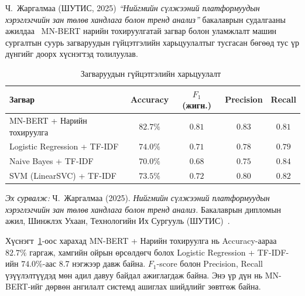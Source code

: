 Ч.~Жаргалмаа (ШУТИС, 2025) \textit{``Нийгмийн сүлжээний платформуудын
хэрэглэгчийн зан төлөв хандлага болон тренд анализ''} бакалаврын судалгааны
ажилдаа~\cite{jargalmaa2025} MN-BERT нарийн тохируулгатай загвар болон уламжлалт
машин сургалтын суурь загваруудын гүйцэтгэлийн харьцуулалтыг тусгасан бөгөөд
тус үр дүнгийг доорх хүснэгтэд толилуулав.

\begin{table}[ht]
  \centering
  \caption{Загваруудын гүйцэтгэлийн харьцуулалт~\cite{jargalmaa2025}}
  \label{tab:model-comparison}
  \begin{tabular}{lcccc}
    \toprule
    \textbf{Загвар} & \textbf{Accuracy} & \textbf{$F_1$ (жигн.)} &
    \textbf{Precision} & \textbf{Recall} \\
    \midrule
    MN-BERT + Нарийн тохируулга        & $82.7\%$ & $0.81$ & $0.83$ & $0.81$ \\
    Logistic Regression + TF-IDF       & $74.0\%$ & $0.71$ & $0.78$ & $0.79$ \\
    Naive Bayes + TF-IDF               & $70.0\%$ & $0.68$ & $0.75$ & $0.84$ \\
    SVM (LinearSVC) + TF-IDF           & $73.5\%$ & $0.72$ & $0.80$ & $0.82$ \\
    \bottomrule
  \end{tabular}
  \par\vspace{4pt}
  \begin{minipage}{\linewidth}
    \footnotesize\textit{Эх сурвалж:} Ч.~Жаргалмаа (2025).
    \textit{Нийгмийн сүлжээний платформуудын хэрэглэгчийн зан төлөв хандлага
    болон тренд анализ.} Бакалаврын дипломын ажил,
    Шинжлэх Ухаан, Технологийн Их Сургууль (ШУТИС)~\cite{jargalmaa2025}.
  \end{minipage}
\end{table}

\medskip
Хүснэгт~\ref{tab:model-comparison}-оос харахад MN-BERT + Нарийн тохируулга нь
Accuracy-аараа $82.7\%$ гаргаж, хамгийн ойрын өрсөлдөгч болох Logistic
Regression + TF-IDF-ийн $74.0\%$-аас 8.7 нэгжээр давж байна. $F_1$-score болон
Precision, Recall үзүүлэлтүүдэд мөн адил давуу байдал ажиглагдаж байна. Энэ үр
дүн нь MN-BERT-ийг дөрвөн ангилалт системд ашиглах шийдлийг зөвтгөж байна.


